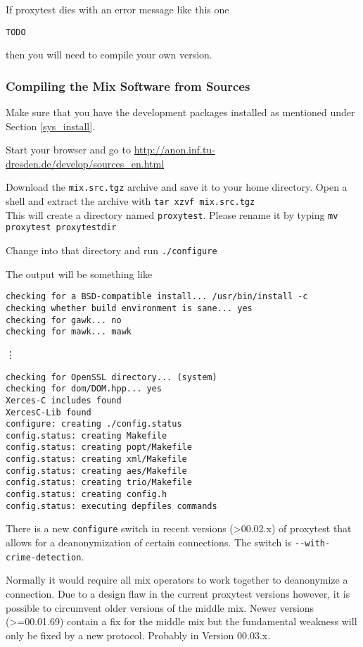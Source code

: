 \documentclass{article}
\begin{document}
If proxytest dies with an error message like
this one

\verb|TODO|

then you will need to compile your own version.


\subsubsection{Compiling the Mix Software from Sources}
\label{compilemix}

Make sure that you have the development packages installed as mentioned
under Section \ref{sys_install}.

Start your browser and go to
\url{http://anon.inf.tu-dresden.de/develop/sources_en.html}

Download the \verb|mix.src.tgz| archive and save it to your home directory.
Open a shell and extract the archive with \verb|tar xzvf mix.src.tgz| \\
This will create a directory named \verb|proxytest|. Please rename it by
typing \verb|mv proxytest proxytestdir| 

Change into that directory and run \verb|./configure| 

The output will be something like 
\begin{verbatim}
checking for a BSD-compatible install... /usr/bin/install -c
checking whether build environment is sane... yes
checking for gawk... no
checking for mawk... mawk
\end{verbatim}
\vdots
\begin{verbatim}
checking for OpenSSL directory... (system)
checking for dom/DOM.hpp... yes
Xerces-C includes found
XercesC-Lib found
configure: creating ./config.status
config.status: creating Makefile
config.status: creating popt/Makefile
config.status: creating xml/Makefile
config.status: creating aes/Makefile
config.status: creating trio/Makefile
config.status: creating config.h
config.status: executing depfiles commands
\end{verbatim}

There is a new \verb|configure| switch in recent versions (>00.02.x)
of proxytest that allows for a deanonymization of certain connections.
The switch is \verb|--with-crime-detection|. 

Normally it would require all mix operators to work together to
deanonymize a connection. Due to a design flaw in the current
proxytest versions however, it is possible to circumvent older
versions of the middle mix. Newer versions (>=00.01.69) contain a fix
for the middle mix but the fundamental weakness will only be fixed by
a new protocol. Probably in Version 00.03.x.
\end{document}
